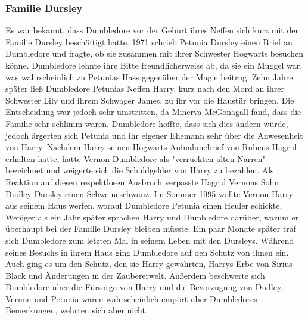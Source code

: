 \documentclass[a4paper, 10pt]{article}
\begin{document}
\subsubsection*{\large Familie Dursley}
Es war bekannt, dass Dumbledore vor der Geburt ihres Neffen sich kurz mit der Familie Dursley beschäftigt hatte. 1971 schrieb Petunia Dursley einen Brief an Dumbledore und fragte, ob sie zusammen mit ihrer Schwester Hogwarts besuchen könne. Dumbledore lehnte ihre Bitte freundlicherweise ab, da sie ein Muggel war, was wahrscheinlich zu Petunias Hass gegenüber der Magie beitrug. Zehn Jahre später ließ Dumbledore Petunias Neffen Harry, kurz nach den Mord an ihrer Schwester Lily und ihrem Schwager James, zu ihr vor die Haustür bringen. Die Entscheidung war jedoch sehr umstritten, da Minerva McGonagall fand, dass die Familie sehr schlimm waren. Dumbledore hoffte, dass sich dies ändern würde, jedoch ärgerten sich Petunia und ihr eigener Ehemann sehr über die Anwesenheit von Harry.
\vspace{10pt}
\newline
Nachdem Harry seinen Hogwarts-Aufnahmebrief von Rubeus Hagrid erhalten hatte, hatte Vernon Dumbledore als "verrückten alten Narren" bezeichnet und weigerte sich die Schuldgelder von Harry zu bezahlen. Als Reaktion auf diesen respektlosen Ausbruch verpasste Hagrid Vernons Sohn Dudley Dursley einen Schweineschwanz. Im Sommer 1995 wollte Vernon Harry aus seinem Haus werfen, worauf Dumbledore Petunia einen Heuler schickte. Weniger als ein Jahr später sprachen Harry und Dumbledore darüber, warum er überhaupt bei der Familie Dursley bleiben müsste.
\vspace{10pt}
\newline
Ein paar Monate später traf sich Dumbledore zum letzten Mal in seinem Leben mit den Dursleys. Während seines Besuchs in ihrem Haus ging Dumbledore auf den Schutz von ihnen ein. Auch ging es um den Schutz, den sie Harry gewährten, Harrys Erbe von Sirius Black und Änderungen in der Zaubererwelt. Außerdem beschwerte sich Dumbledore über die Fürsorge von Harry und die Bevorzugung von Dudley. Vernon und Petunia waren wahrscheinlich empört über Dumbledores Bemerkungen, wehrten sich aber nicht.
\end{document}
